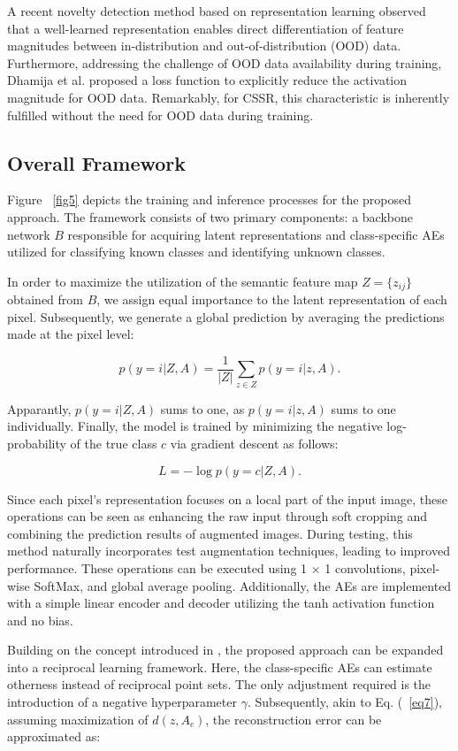 \documentclass{gji}
\begin{document}
A recent novelty detection method based on representation learning \cite{38} observed that a well-learned representation enables direct differentiation of feature magnitudes between in-distribution and out-of-distribution (OOD) data. Furthermore, addressing the challenge of OOD data availability during training, Dhamija et al. \cite{9} proposed a loss function to explicitly reduce the activation magnitude for OOD data. Remarkably, for CSSR, this characteristic is inherently fulfilled without the need for OOD data during training.
  
  
\subsection{Overall Framework}
Figure ~\ref{fig5} depicts the training and inference processes for the proposed approach. The framework consists of two primary components: a backbone network $B$ responsible for acquiring latent representations and class-specific AEs utilized for classifying known classes and identifying unknown classes.

In order to maximize the utilization of the semantic feature map $Z = \{z_{ij}\}$ obtained from $B$, we assign equal importance to the latent representation of each pixel. Subsequently, we generate a global prediction by averaging the predictions made at the pixel level:

\[
p(y = i|Z, A) = \frac{1}{|Z|} \sum_{z \in Z} p(y = i|z, A). \tag{9} \label{eq9} 
\]

Apparantly, $p(y = i|Z, A)$ sums to one, as $p(y = i|z, A)$ sums to one individually. Finally, the model is trained by minimizing the negative log-probability of the true class $c$ via gradient descent as follows:

\[
L = -\log p(y = c|Z, A). \tag{10} \label{eq10} 
\]

Since each pixel's representation focuses on a local part of the input image, these operations can be seen as enhancing the raw input through soft cropping and combining the prediction results of augmented images. During testing, this method naturally incorporates test augmentation techniques, leading to improved performance. These operations can be executed using 1 × 1 convolutions, pixel-wise SoftMax, and global average pooling. Additionally, the AEs are implemented with a simple linear encoder and decoder utilizing the tanh activation function and no bias.

Building on the concept introduced in \cite{4}, the proposed approach can be expanded into a reciprocal learning framework. Here, the class-specific AEs can estimate otherness instead of reciprocal point sets. The only adjustment required is the introduction of a negative hyperparameter $\gamma$. Subsequently, akin to Eq. (~\ref{eq7}), assuming maximization of $d(z, A_c)$, the reconstruction error can be approximated as:
\end{document}
